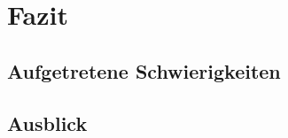 \chapter{Fazit}\label{chap:conclusion}

\section{Aufgetretene Schwierigkeiten}

\section{Ausblick}

